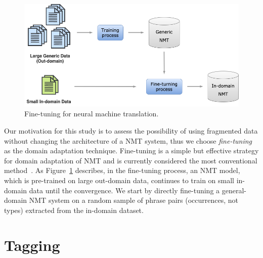 \begin{figure}[ht!]
    \centering
    \includegraphics[scale=0.45]{images/domain_adaptation_nmt.png}
    \caption{Fine-tuning for neural machine translation. }
    \label{fig:fine_tuning}
\end{figure}

Our motivation for this study is to assess the possibility of using fragmented data without changing the architecture of a NMT system, thus we choose \textit{fine-tuning} as the domain adaptation technique. Fine-tuning is a simple but effective strategy for domain adaptation of NMT and is currently considered the most conventional method~\parencite{luong2015stanford, sennrich-etal-2016-improving}. 
As Figure~\ref{fig:fine_tuning} describes, in the fine-tuning process, an NMT model, which is pre-trained on large out-domain data, continues to train on small in-domain data until the convergence.
We start by directly fine-tuning a general-domain NMT system on a random sample of phrase pairs (occurrences, not types) extracted from the in-domain dataset.

\section{Tagging}\label{section:tagging}

